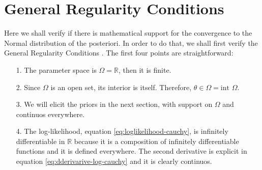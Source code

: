 \documentclass[a4paper,10pt, notitlepage]{report}
\theoremstyle{plain}
\newcommand{\R}{\mathbb{R}}
\begin{document}
\section*{General Regularity Conditions}

Here we shall verify if there is mathematical support for the convergence to
the Normal distribution of the posteriori. In order to do that, we shall first
verify the General Regularity Conditions \cite[Page 436]{schervish1996theory}.
The first four points are straightforward: 

\begin{enumerate}
    \item[1.] The parameter space is $\Omega = \R$, then it is finite.  
    \item[2.] Since $\Omega$ is an open set, its interior is itself.
    Therefore, $\theta \in \Omega = \text{int } \Omega$.   
    \item[3.] We will elicit the priors in the next section, with support
    on $\Omega$ and continuos everywhere.
    \item[4.] The log-likelihood, equation \ref{eq:loglikelihood-cauchy}, 
    is infinitely differentiable in $\R$ because it is a composition of
    infinitely differentiable functions and it is defined everywhere. The
    second derivative is explicit in equation
    \ref{eq:dderivarive-log-cauchy} and it is clearly continuos. 
\end{enumerate}
\end{document}
